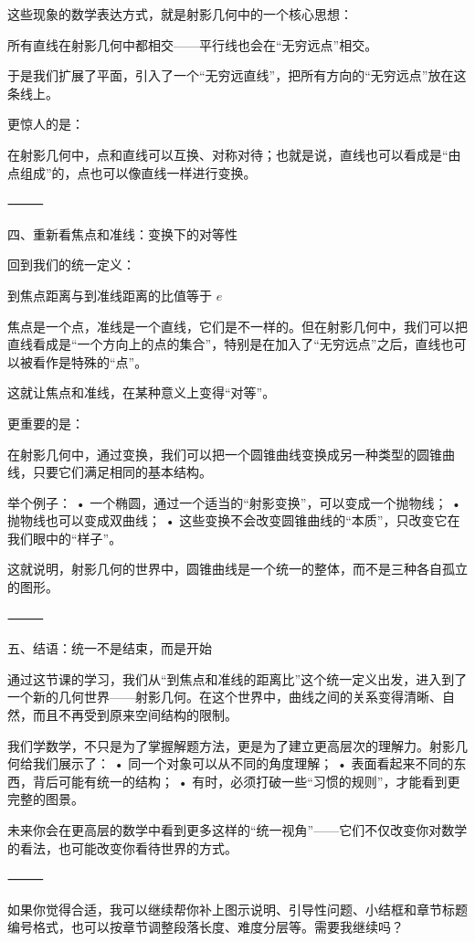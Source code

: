 这些现象的数学表达方式，就是射影几何中的一个核心思想：

所有直线在射影几何中都相交——平行线也会在“无穷远点”相交。

于是我们扩展了平面，引入了一个“无穷远直线”，把所有方向的“无穷远点”放在这条线上。

更惊人的是：

在射影几何中，点和直线可以互换、对称对待；也就是说，直线也可以看成是“由点组成”的，点也可以像直线一样进行变换。

⸻

四、重新看焦点和准线：变换下的对等性

回到我们的统一定义：

到焦点距离与到准线距离的比值等于 $e$

焦点是一个点，准线是一个直线，它们是不一样的。但在射影几何中，我们可以把直线看成是“一个方向上的点的集合”，特别是在加入了“无穷远点”之后，直线也可以被看作是特殊的“点”。

这就让焦点和准线，在某种意义上变得“对等”。

更重要的是：

在射影几何中，通过变换，我们可以把一个圆锥曲线变换成另一种类型的圆锥曲线，只要它们满足相同的基本结构。

举个例子：
	•	一个椭圆，通过一个适当的“射影变换”，可以变成一个抛物线；
	•	抛物线也可以变成双曲线；
	•	这些变换不会改变圆锥曲线的“本质”，只改变它在我们眼中的“样子”。

这就说明，射影几何的世界中，圆锥曲线是一个统一的整体，而不是三种各自孤立的图形。

⸻

五、结语：统一不是结束，而是开始

通过这节课的学习，我们从“到焦点和准线的距离比”这个统一定义出发，进入到了一个新的几何世界——射影几何。在这个世界中，曲线之间的关系变得清晰、自然，而且不再受到原来空间结构的限制。

我们学数学，不只是为了掌握解题方法，更是为了建立更高层次的理解力。射影几何给我们展示了：
	•	同一个对象可以从不同的角度理解；
	•	表面看起来不同的东西，背后可能有统一的结构；
	•	有时，必须打破一些“习惯的规则”，才能看到更完整的图景。

未来你会在更高层的数学中看到更多这样的“统一视角”——它们不仅改变你对数学的看法，也可能改变你看待世界的方式。

⸻

如果你觉得合适，我可以继续帮你补上图示说明、引导性问题、小结框和章节标题编号格式，也可以按章节调整段落长度、难度分层等。需要我继续吗？